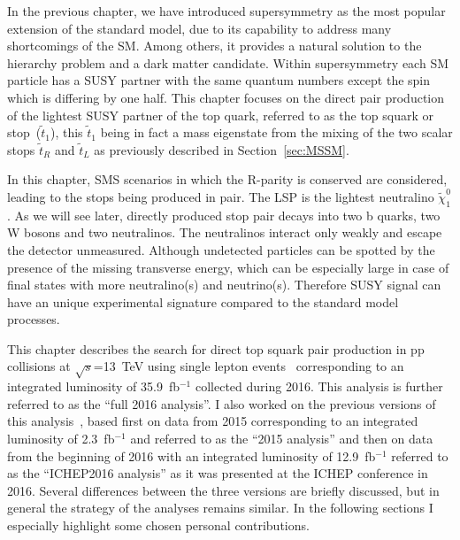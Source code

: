 \clearpage

\setcounter{secnumdepth}{4}
\setcounter{secnumdepth}{4}


In the previous chapter, we have introduced  supersymmetry as the most popular extension of the standard model, due to its capability to address many shortcomings of the SM. Among others, it provides a natural solution to the hierarchy problem and a dark matter candidate. Within supersymmetry each SM particle has a SUSY partner with the same quantum numbers except the spin which is differing by one half. This chapter focuses on the direct pair production of the lightest SUSY partner of the top quark, referred to as the top squark or stop~($\tilde{t}_{1}$), this $\tilde{t}_{1}$ being in fact a mass eigenstate  from the mixing of the two scalar stops $\tilde{t}_{R}$ and  $\tilde{t}_{L}$ as previously described in Section~\ref{sec:MSSM}.


In this chapter, SMS scenarios in which the R-parity is conserved are considered, leading to  the stops being produced in pair. The LSP is the lightest neutralino $\tilde{\chi}^{0}_{1}$. As we will see later, directly produced stop pair decays into two b quarks, two W bosons and two neutralinos. The neutralinos interact only weakly and escape the detector unmeasured. Although undetected particles can be spotted by the presence of the missing transverse energy, which can be especially large in case of final states with more neutralino(s) and neutrino(s). Therefore SUSY signal can have an unique experimental signature compared to the standard model processes.

This chapter describes the search for direct top squark pair production in pp collisions at $\sqrt{s}$=13~TeV using single lepton events~\cite{Sirunyan:2017xse} corresponding to an integrated luminosity of 35.9~fb$^{-1}$ collected during 2016. This analysis is further referred to as the ``full 2016 analysis''.  I also worked on the previous versions of this analysis~\cite{Sirunyan:2016jpr, CMS:2016vew}, based first on data from 2015 corresponding to an integrated luminosity of 2.3~fb$^{-1}$ and referred to as the ``2015 analysis'' and then on data from the beginning of 2016 with an integrated luminosity of 12.9~fb$^{-1}$ referred to as the ``ICHEP2016 analysis'' as it was presented at the ICHEP conference in 2016. Several differences between the three versions are briefly discussed, but in general the strategy of the analyses remains similar. In the following sections I especially highlight some chosen personal contributions.

